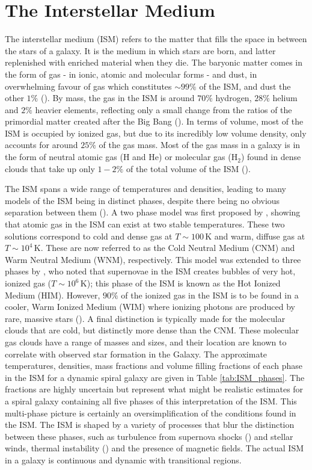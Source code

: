 \section{The Interstellar Medium}

The interstellar medium (ISM) refers to the matter that fills the space in between the stars of a galaxy. It is the medium in which stars are born, and latter replenished with enriched material when they die. The baryonic matter comes in the form of gas - in ionic, atomic and molecular forms - and dust, in overwhelming favour of gas which constitutes $\sim99\%$ of the ISM, and dust the other $1\%$ (\citealt{Ferriere_2001}). By mass, the gas in the ISM is around $70\%$ hydrogen, $28\%$ helium and $2\%$ heavier elements, reflecting only a small change from the ratios of the primordial matter created after the Big Bang (\citealt{Klessen_2016}). In terms of volume, most of the ISM is occupied by ionized gas, but due to its incredibly low volume density, only accounts for around $25\%$ of the gas mass. Most of the gas mass in a galaxy is in the form of neutral atomic gas (H and He) or molecular gas (H$_2$) found in dense clouds that take up only $1 - 2\%$ of the total volume of the ISM (\citealt{Dyson_1997, Klessen_2016}).

The ISM spans a wide range of temperatures and densities, leading to many models of the ISM being in distinct phases, despite there being no obvious separation between them (\citealt{Cox_2005}). A two phase model was first proposed by \citealt{Field_1969}, showing that atomic gas in the ISM can exist at two stable temperatures. These two solutions correspond to cold and dense gas at $T\sim100\,$K and warm, diffuse gas at $T\sim10^4\,$K. These are now referred to as the Cold Neutral Medium (CNM) and Warm Neutral Medium (WNM), respectively. This model was extended to three phases by \citealt{McKee_1977}, who noted that supernovae in the ISM creates bubbles of very hot, ionized gas ($T\sim10^6\,$K); this phase of the ISM is known as the Hot Ionized Medium (HIM). However, $90\%$ of the ionized gas in the ISM is to be found in a cooler, Warm Ionized Medium (WIM) where ionizing photons are produced by rare, massive stars (\citealt{Haffner_2009}). A final distinction is typically made for the molecular clouds that are cold, but distinctly more dense than the CNM. These molecular gas clouds have a range of masses and sizes, and their location are known to correlate with observed star formation in the Galaxy. The approximate temperatures, densities, mass fractions and volume filling fractions of each phase in the ISM for a dynamic spiral galaxy are given in Table \ref{tab:ISM_phases}. The fractions are highly uncertain but represent what might be realistic estimates for a spiral galaxy containing all five phases of this interpretation of the ISM. This multi-phase picture is certainly an oversimplification of the conditions found in the ISM. The ISM is shaped by a variety of processes that blur the distinction between these phases, such as turbulence from supernova shocks (\citealt{MacLow_2004}) and stellar winds, thermal instability (\citealt{Kritsuk_2002}) and the presence of magnetic fields. The actual ISM in a galaxy is continuous and dynamic with transitional regions.


